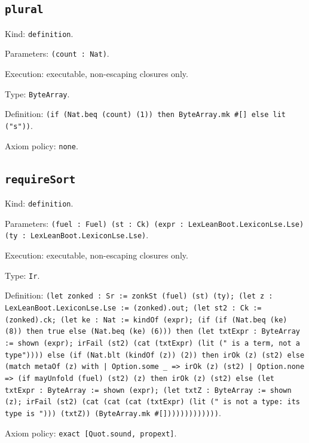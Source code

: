 \documentclass[11pt]{article}
\begin{document}
\subsection*{\texttt{plural}}
\noindent Kind: \texttt{definition}.\par
\noindent Parameters: \texttt{(count : Nat)}.\par
\noindent Execution: executable, non-escaping closures only.\par
\noindent Type: \texttt{ByteArray}.\par
\noindent Definition: \texttt{(if (Nat.beq (count) (1)) then ByteArray.mk \#[] else lit ("s"))}.\par
\noindent Axiom policy: \texttt{none}.\par
\subsection*{\texttt{requireSort}}
\noindent Kind: \texttt{definition}.\par
\noindent Parameters: \texttt{(fuel : Fuel) (st : Ck) (expr : LexLeanBoot.LexiconLse.Lse) (ty : LexLeanBoot.LexiconLse.Lse)}.\par
\noindent Execution: executable, non-escaping closures only.\par
\noindent Type: \texttt{Ir}.\par
\noindent Definition: \texttt{(let zonked : Sr := zonkSt (fuel) (st) (ty); (let z : LexLeanBoot.LexiconLse.Lse := (zonked).out; (let st2 : Ck := (zonked).ck; (let ke : Nat := kindOf (expr); (if (if (Nat.beq (ke) (8)) then true else (Nat.beq (ke) (6))) then (let txtExpr : ByteArray := shown (expr); irFail (st2) (cat (txtExpr) (lit (" is a term, not a type")))) else (if (Nat.blt (kindOf (z)) (2)) then irOk (z) (st2) else (match metaOf (z) with | Option.some \_ => irOk (z) (st2) | Option.none => (if mayUnfold (fuel) (st2) (z) then irOk (z) (st2) else (let txtExpr : ByteArray := shown (expr); (let txtZ : ByteArray := shown (z); irFail (st2) (cat (cat (cat (txtExpr) (lit (" is not a type: its type is "))) (txtZ)) (ByteArray.mk \#[]))))))))))))}.\par
\noindent Axiom policy: \texttt{exact [Quot.sound, propext]}.\par
\end{document}
